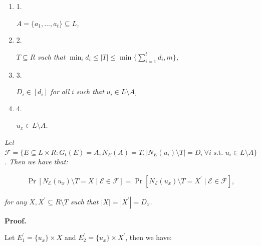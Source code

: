 \documentclass[10pt,a4paper]{article}
\begin{document}
\begin{enumerate}


\item[] 1. 


$A=\{a_{1},\dots,a_{t}\}\subseteq L$\emph{,}\par




\item[] 2. 


$T\subseteq R$\emph{ such that }$\min_{i}{d_{i}}\leq|T|\leq\min\{\sum_{i=1}^{t}d_{i},m\}$\emph{,}\par




\item[] 3. 


$D_{i}\in[d_{i}]$\emph{ for all }$i$\emph{ such that }$u_{i}\in L\setminus A$\emph{,}\par




\item[] 4. 


$u_{x}\in L\setminus A$\emph{.}\par




\end{enumerate}


\emph{Let $\mathscr{F}=\{E\subseteq L\times R:G_{t}(E)=A,N_{E}(A)=T,|N_{E}(u_{i})\setminus T|=D_{i}\ \forall i\text{ s.t. }u_{i}\in L\setminus A\}$.
Then we have that:}\par


\[\begin{gathered}
\displaystyle\Pr\left[N_{\mathcal{E}}(u_{x})\setminus T=X\mid\mathcal{E}\in\mathscr{F}\right]=\Pr\left[N_{\mathcal{E}}(u_{x})\setminus T=X^{\prime}\mid\mathcal{E}\in\mathscr{F}\right],
\end{gathered}\]


\emph{for any $X,X^{\prime}\subseteq R\setminus T$ such that $|X|=|X^{\prime}|=D_{x}$.}\par






\par\medskip\noindent\textbf{Proof.}\par



Let $E^{\prime}_{1}=\{u_{x}\}\times X$ and $E^{\prime}_{2}=\{u_{x}\}\times X^{\prime}$, then we have:\par
\end{document}
